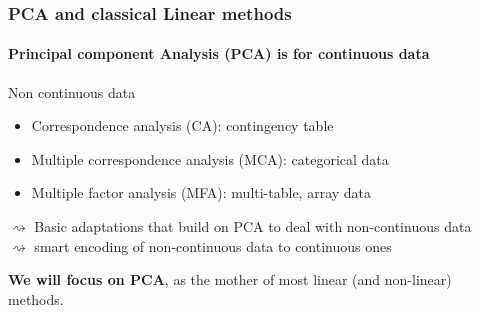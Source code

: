 \documentclass{beamer}\usepackage[]{graphicx}\usepackage[]{color}
\begin{document}
\begin{frame}
  \frametitle{PCA and classical Linear methods}
  
  \paragraph{\bf Principal component Analysis (PCA) is for continuous data}

  \begin{block}{Non continuous data}
  \begin{itemize}
    \item Correspondence analysis (CA): contingency table \medskip
    \item Multiple correspondence analysis (MCA): categorical data \medskip
    \item Multiple factor analysis (MFA): multi-table, array data 
  \end{itemize}
  $\rightsquigarrow$ Basic \alert{adaptations that build on PCA} to deal with non-continuous data\\
  $\rightsquigarrow$ smart encoding of non-continuous data to continuous ones
  \end{block}

  \vfill
  
  \begin{center}
    \alert{\bf We will focus on PCA}, as the mother of most linear (and non-linear) methods.
  \end{center}
  
\end{frame}
\end{document}

